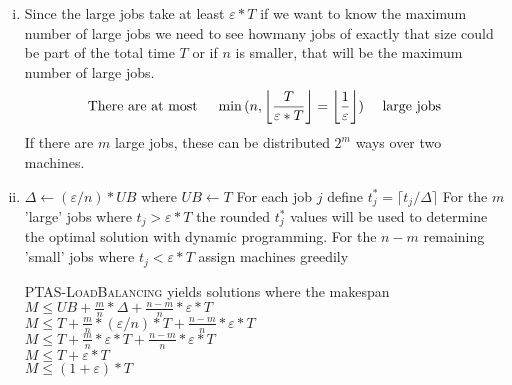 \begin{enumerate}[(i)]
	\item Since the large jobs take at least $\varepsilon * T$ if we want to know the maximum number of large jobs we need to see howmany jobs of exactly that size could be part of the total time $T$ or if $n$ is smaller, that will be the maximum number of large jobs. 
\[ \text{There are at most \hspace*{10pt}} \min{(n,\left \lfloor\frac{T}{\varepsilon * T} \right \rfloor = \left \lfloor \frac{1}{\varepsilon} \right \rfloor)} \text{\hspace*{10pt} large jobs} \] 
If there are $m$ large jobs, these can be distributed $2^m$ ways over two machines.
	\item 

\begin{sourcecode}
$\Delta \leftarrow (\varepsilon / n) * UB$ where $UB \leftarrow T$ 
For each job $j$ define $t_j^* = \lceil t_j / \Delta \rceil$
For the $m$ 'large' jobs where $t_j > \varepsilon * T$ the rounded $t_j^*$ values will be used to determine the optimal solution with dynamic programming. 
For the $n-m$ remaining 'small' jobs where $t_j < \varepsilon * T$ assign machines greedily 
\qend
\end{sourcecode}

\textsc{PTAS-LoadBalancing} yields solutions where the makespan \\
$M \leq UB + \frac{m}{n} * \Delta + \frac{n-m}{n} * \varepsilon * T$\\
$M \leq T + \frac{m}{n} * (\varepsilon / n) * T + \frac{n-m}{n} * \varepsilon * T$\\
$M \leq T + \frac{m}{n} * \varepsilon * T + \frac{n-m}{n} * \varepsilon * T$\\
$M \leq T + \varepsilon * T$\\
$M \leq (1+\varepsilon) * T$\\
\end{enumerate}
